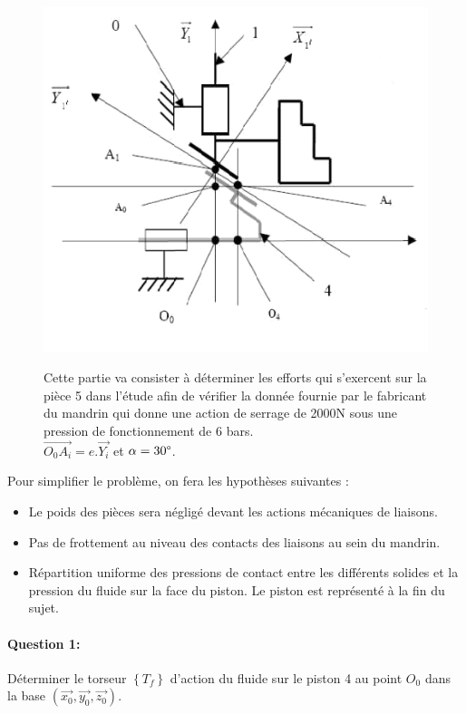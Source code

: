 \begin{figure}[!h]
  \begin{minipage}{0.48\linewidth}
  \centering\includegraphics[width=.9\linewidth]{img/mandrin_cin.png}
  \end{minipage}
  \hfill
  \begin{minipage}{0.48\linewidth}
Cette partie va consister à déterminer les efforts qui s'exercent sur la pièce 5 dans l'étude afin de vérifier la donnée fournie par le fabricant du mandrin qui donne une action de serrage de 2000N sous une pression de fonctionnement de 6 bars. \\
$\overrightarrow{O_0A_i}=e.\overrightarrow{Y_i}$ et $\alpha=30\degree$.
 \end{minipage}
\end{figure}

Pour simplifier le problème, on fera les hypothèses suivantes : 
\begin{itemize}
 \item Le poids des pièces sera négligé devant les actions mécaniques de liaisons. 
 \item Pas de frottement au niveau des contacts des liaisons au sein du mandrin. 
 \item Répartition uniforme des pressions de contact entre les différents solides et la pression du fluide sur la face du piston. Le piston est représenté à la fin du sujet.
\end{itemize}

\paragraph{Question 1:} Déterminer le torseur $\left\{T_f\right\}$ d'action du fluide sur le piston 4 au point $O_0$ dans la base $(\overrightarrow{x_0},\overrightarrow{y_0},\overrightarrow{z_0})$.

